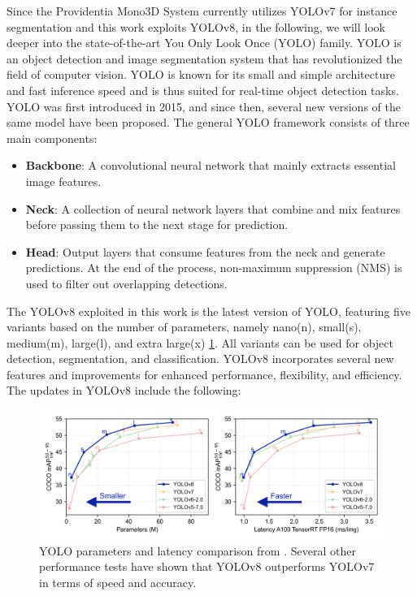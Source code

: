 Since the Providentia Mono3D System currently utilizes YOLOv7 \cite{yolov7} for instance segmentation and this work exploits YOLOv8, in the following, we will look deeper into the state-of-the-art You Only Look Once (YOLO) \cite{yolo} family. YOLO is an object detection and image segmentation system that has revolutionized the field of computer vision. YOLO is known for its small and simple architecture and fast inference speed and is thus suited for real-time object detection tasks. YOLO was first introduced in 2015, and since then, several new versions of the same model have been proposed. The general YOLO framework consists of three main components: 
\begin{itemize}
	\item \textbf{Backbone}: A convolutional neural network that mainly extracts essential image features.
	\item \textbf{Neck}: A collection of neural network layers that combine and mix features before passing them to the next stage for prediction. 
	\item \textbf{Head}: Output layers that consume features from the neck and generate predictions. At the end of the process, non-maximum suppression (NMS) is used to filter out overlapping detections.  
\end{itemize}

The YOLOv8 exploited in this work is the latest version of YOLO, featuring five variants based on the number of parameters, namely nano(n), small(s), medium(m), large(l), and extra large(x) \cref{YOLO comparison}. All variants can be used for object detection, segmentation, and classification. YOLOv8 incorporates several new features and improvements for enhanced performance, flexibility, and efficiency. The updates in YOLOv8 include the following:

\begin{figure}[htb]%
	\centering%
	\includegraphics[width=150mm]{figures/yolo-comparison-plots.png}%
	\caption{YOLO parameters and latency comparison from \cite{yolov8}. Several other performance tests have shown that YOLOv8 outperforms YOLOv7 in terms of speed and accuracy.}%
	\label{YOLO comparison}%
\end{figure}%

